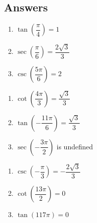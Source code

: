 \newpage

\subsection{Answers}

\begin{multicols}{3}

\begin{enumerate}

\item $\tan \left( \dfrac{\pi}{4} \right) = 1$ 
\item $\sec \left( \dfrac{\pi}{6} \right) = \dfrac{2\sqrt{3}}{3}$
\item $\csc \left( \dfrac{5\pi}{6} \right) = 2$ 

\setcounter{HW}{\value{enumi}}

\end{enumerate}

\end{multicols}

\begin{multicols}{3}

\begin{enumerate}

\setcounter{enumi}{\value{HW}}

\item $\cot \left( \dfrac{4\pi}{3} \right) = \dfrac{\sqrt{3}}{3}$
\item $\tan \left( -\dfrac{11\pi}{6} \right) = \dfrac{\sqrt{3}}{3}$
\item $\sec \left( -\dfrac{3\pi}{2} \right)$ is undefined 

\setcounter{HW}{\value{enumi}}

\end{enumerate}

\end{multicols}

\begin{multicols}{3}

\begin{enumerate}

\setcounter{enumi}{\value{HW}}

\item $\csc \left( -\dfrac{\pi}{3} \right) = -\dfrac{2\sqrt{3}}{3}$
\item $\cot \left( \dfrac{13\pi}{2} \right) = 0$
\item $\tan \left( 117\pi \right) = 0$ 

\setcounter{HW}{\value{enumi}}

\end{enumerate}

\end{multicols}

